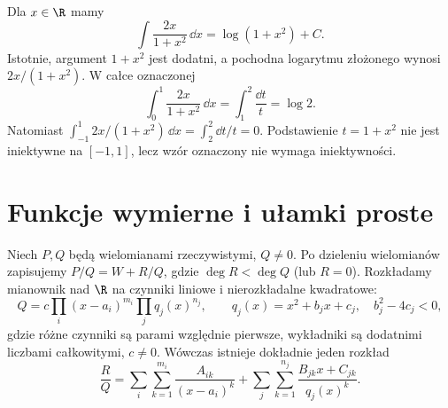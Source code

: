 \begin{przyklad}
\label{ma1:ex:substitution-basic}
Dla $x\in\R$ mamy
\[
 \int\frac{2x}{1+x^2}\,\dd x=\log(1+x^2)+C.
\]
Istotnie, argument $1+x^2$ jest dodatni, a pochodna logarytmu złożonego wynosi $2x/(1+x^2)$. W całce oznaczonej
\[
 \int_0^1\frac{2x}{1+x^2}\,\dd x
 =\int_1^2\frac{\dd t}{t}=\log2.
\]
Natomiast $\int_{-1}^1 2x/(1+x^2)\,\dd x=\int_2^2\dd t/t=0$. Podstawienie $t=1+x^2$ nie jest iniektywne na $[-1,1]$, lecz wzór oznaczony nie wymaga iniektywności.
\end{przyklad}

\section{Funkcje wymierne i ułamki proste}
\begin{twierdzenie}
\label{ma1:thm:partial-fractions}
Niech $P,Q$ będą wielomianami rzeczywistymi, $Q\ne0$. Po dzieleniu wielomianów zapisujemy $P/Q=W+R/Q$, gdzie $\deg R<\deg Q$ (lub $R=0$). Rozkładamy mianownik nad $\R$ na czynniki liniowe i nierozkładalne kwadratowe:
\[
 Q=c\prod_i(x-a_i)^{m_i}\prod_j q_j(x)^{n_j},
 \qquad q_j(x)=x^2+b_jx+c_j,\quad b_j^2-4c_j<0,
\]
gdzie różne czynniki są parami względnie pierwsze, wykładniki są dodatnimi liczbami całkowitymi, $c\ne0$. Wówczas istnieje dokładnie jeden rozkład
\[
 \frac{R}{Q}
 =\sum_i\sum_{k=1}^{m_i}\frac{A_{ik}}{(x-a_i)^k}
 +\sum_j\sum_{k=1}^{n_j}\frac{B_{jk}x+C_{jk}}{q_j(x)^k}.
\]
\end{twierdzenie}
